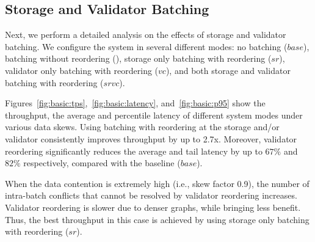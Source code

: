 \subsection{Storage and Validator Batching}
\label{subsec:experiment:batching}

Next, we perform a detailed analysis on the effects of storage and validator batching. We configure the system in several different modes: no batching ($base$), batching without reordering (), storage only batching with reordering ($sr$), validator only batching with reordering
($vc$), and both storage and validator batching with reordering ($srvc$).




Figures~\ref{fig:basic:tps},~\ref{fig:basic:latency}, and~\ref{fig:basic:p95} show the throughput, the average and percentile latency of different system modes under various data skews. Using batching with reordering at the storage and/or validator consistently improves throughput by up to 2.7x.  Moreover, validator reordering significantly reduces the average and tail latency by up to $67\%$ and $82\%$ respectively, compared with the baseline ($base$).

When the data contention is extremely high (i.e., skew factor 0.9), the number of intra-batch conflicts
that cannot be resolved by validator reordering increases. Validator reordering
is slower due to denser graphs, while bringing less benefit. Thus, the best throughput in this case is achieved by using storage only batching with reordering ($sr$). 

